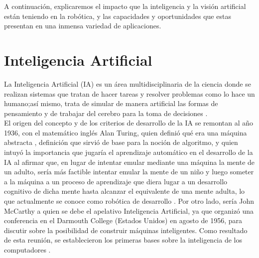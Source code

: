 A continuación, explicaremos el impacto que la inteligencia y la visión artificial están teniendo en la robótica, y las capacidades y oportunidades que estas presentan en una inmensa variedad de aplicaciones.

\section{Inteligencia Artificial}
\label{sec:IA} 

La Inteligencia Artificial (IA) es un área multidisciplinaria de la ciencia %
donde se realizan sistemas que tratan de hacer tareas y resolver problemas como lo hace un humano;así mismo, trata de simular de manera artificial las formas de pensamiento y de trabajar del cerebro para la toma de decisiones \cite{Ponce14}.\\

El origen del concepto y de los criterios de desarrollo de la IA se remontan al año 1936, con el matemático inglés Alan Turing, quien definió qué era una máquina abstracta \cite{Hardy01}, %
definición que sirvió de base para la noción de algoritmo, %
y quien intuyó la importancia que jugaría el aprendizaje automático en el desarrollo de la IA al afirmar que, en lugar de intentar emular mediante una máquina la mente de un adulto, sería más factible intentar emular la mente de un niño y luego someter a la máquina a un proceso de aprendizaje que diera lugar a un desarrollo cognitivo de dicha mente hasta alcanzar el equivalente de una mente adulta, lo que actualmente se conoce como robótica de desarrollo \cite{Gonzalez17}. Por otro lado, sería John McCarthy a quien se debe el apelativo Inteligencia Artificial, ya que organizó una conferencia en el Darmouth College (Estados Unidos) en agosto de 1956, para discutir sobre la posibilidad de construir máquinas inteligentes. Como resultado de esta reunión, se establecieron los primeras bases sobre la inteligencia de los computadores \cite{Ponce14}.\\ 


